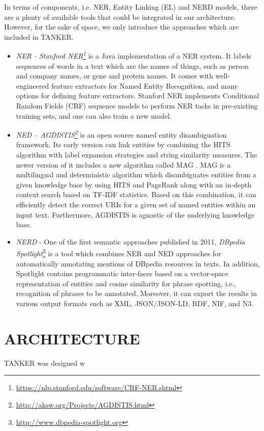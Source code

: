 \documentclass{sig-alternate}
\begin{document}
In terms of components, i.e. NER, Entity Linking (EL) and NERD models, there are a plenty of available tools that could be integrated in our architecture. However, for the sake of space, we only introduce the approaches which are included in TANKER.
\begin{itemize}
\item {\em NER - Stanford NER}{\em \footnote{\url{https://nlp.stanford.edu/software/CRF-NER.shtml}}}{\em } \cite{_Ref490760481}is a Java implementation of a NER system. It labels sequences of words in a text which are the names of things, such as person and company names, or gene and protein names. It comes with well-engineered feature extractors for Named Entity Recognition, and many options for defining feature extractors. Stanford NER implements Conditional Random Fields (CRF) sequence models to perform NER tasks in pre-existing training sets, and one can also train a new model.
\item {\em NED -- AGDISTIS}{\em \footnote{\url{http://aksw.org/Projects/AGDISTIS.html}}}{\em } \cite{_Ref490760498}is an open source named entity disambiguation framework. Its early version can link entities by combining the HITS algorithm with label expansion strategies and string similarity measures. The newer version of it includes a new algorithm called MAG \cite{_Ref490760509}. MAG is a multilingual and deterministic algorithm which disambiguates entities from a given knowledge base by using HITS and PageRank along with an in-depth context search based on TF-IDF statistics. Based on this combination, it can efficiently detect the correct URIs for a given set of named entities within an input text. Furthermore, AGDISTIS is agnostic of the underlying knowledge base.
\item {\em NERD} - One of the first semantic approaches published in 2011, {\em DBpedia Spotlight}\footnote{\url{http://www.dbpedia-spotlight.org}} \cite{_Ref490759726} is a tool which combines NER and NED approaches for automatically annotating mentions of DBpedia resources \cite{_Ref490760525} in texts. In addition, Spotlight contains programmatic inter-faces based on a vector-space representation of entities and cosine similarity for phrase spotting, i.e., recognition of phrases to be annotated. Moreover, it can export the results in various output formats such as XML, JSON/JSON-LD, RDF, NIF, and N3.
\end{itemize}

\section{ARCHITECTURE}\label{_Ref490760383}

TANKER was designed w
\end{document}

